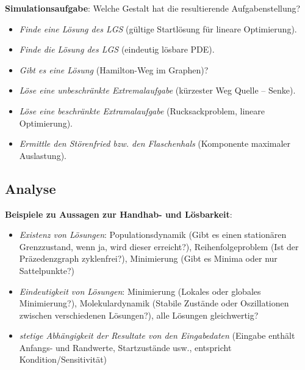 \textbf{Simulationsaufgabe}:
Welche Gestalt hat die resultierende Aufgabenstellung?
\begin{itemize}
    \item
    \emph{Finde eine Lösung des LGS}
    (gültige Startlösung für lineare Optimierung).
    
    \item
    \emph{Finde die Lösung des LGS}
    (eindeutig lösbare PDE).
    
    \item
    \emph{Gibt es eine Lösung}
    (Hamilton-Weg im Graphen)?
    
    \item
    \emph{Löse eine unbeschränkte Extremalaufgabe}
    (kürzester Weg Quelle -- Senke).
    
    \item
    \emph{Löse eine beschränkte Extramalaufgabe}
    (Rucksackproblem, lineare Optimierung).
    
    \item
    \emph{Ermittle den Störenfried bzw. den Flaschenhals}
    (Komponente maximaler Auslastung).
\end{itemize}

\pagebreak

\subsection{%
    Analyse%
}

\textbf{Beispiele zu Aussagen zur Handhab- und Lösbarkeit}:
\begin{itemize}
    \item
    \emph{Existenz von Lösungen}:
    Populationsdynamik (Gibt es einen stationären Grenzzustand, wenn ja, wird dieser erreicht?),
    Reihenfolgeproblem (Ist der Präzedenzgraph zyklenfrei?),
    Minimierung (Gibt es Minima oder nur Sattelpunkte?)
    
    \item
    \emph{Eindeutigkeit von Lösungen}:
    Minimierung (Lokales oder globales Minimierung?),
    Molekulardynamik (Stabile Zustände oder Oszillationen zwischen verschiedenen Lösungen?),
    alle Lösungen gleichwertig?
    
    \item
    \emph{stetige Abhängigkeit der Resultate von den Eingabedaten}
    (Eingabe enthält Anfangs- und Randwerte, Startzustände usw.,
    entspricht Kondition/Sensitivität)
\end{itemize}

